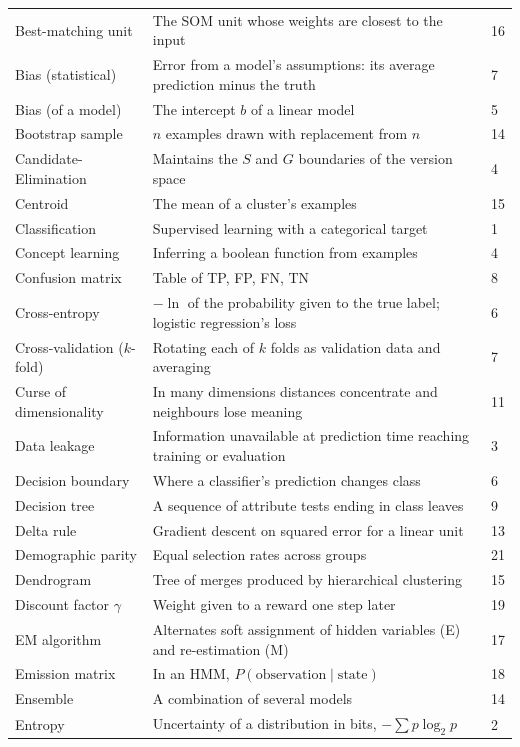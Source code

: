 \begin{longtable}{@{}L{3.9cm}L{9.9cm}L{1.1cm}@{}}
Best-matching unit & The SOM unit whose weights are closest to the input & 16 \\
Bias (statistical) & Error from a model's assumptions: its average prediction minus the truth & 7 \\
Bias (of a model) & The intercept $b$ of a linear model & 5 \\
Bootstrap sample & $n$ examples drawn with replacement from $n$ & 14 \\
Candidate-Elimination & Maintains the $S$ and $G$ boundaries of the version space & 4 \\
Centroid & The mean of a cluster's examples & 15 \\
Classification & Supervised learning with a categorical target & 1 \\
Concept learning & Inferring a boolean function from examples & 4 \\
Confusion matrix & Table of TP, FP, FN, TN & 8 \\
Cross-entropy & $-\ln$ of the probability given to the true label; logistic regression's loss & 6 \\
Cross-validation ($k$-fold) & Rotating each of $k$ folds as validation data and averaging & 7 \\
Curse of dimensionality & In many dimensions distances concentrate and neighbours lose meaning & 11 \\
Data leakage & Information unavailable at prediction time reaching training or evaluation & 3 \\
Decision boundary & Where a classifier's prediction changes class & 6 \\
Decision tree & A sequence of attribute tests ending in class leaves & 9 \\
Delta rule & Gradient descent on squared error for a linear unit & 13 \\
Demographic parity & Equal selection rates across groups & 21 \\
Dendrogram & Tree of merges produced by hierarchical clustering & 15 \\
Discount factor $\gamma$ & Weight given to a reward one step later & 19 \\
EM algorithm & Alternates soft assignment of hidden variables (E) and re-estimation (M) & 17 \\
Emission matrix & In an HMM, $P(\text{observation} \mid \text{state})$ & 18 \\
Ensemble & A combination of several models & 14 \\
Entropy & Uncertainty of a distribution in bits, $-\sum p\log_2 p$ & 2 \\

\end{longtable}
